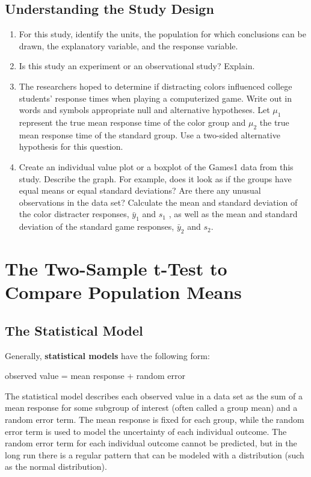 \documentclass[
]{report}
\begin{document}
\subsection{Understanding the Study Design}\label{understanding-the-study-design}

\begin{enumerate}
\def\labelenumi{\arabic{enumi}.}
\item
  For this study, identify the units, the population for which conclusions can be drawn, the explanatory variable, and the response variable.
\item
  Is this study an experiment or an observational study? Explain.
\item
  The researchers hoped to determine if distracting colors influenced college students' response times when playing a computerized game. Write out in words and symbols appropriate null and alternative hypotheses. Let \(\mu_1\) represent the true mean response time of the color group and \(\mu_2\) the true mean response time of the standard group. Use a two-sided alternative hypothesis for this question.
\item
  Create an individual value plot or a boxplot of the Games1 data from this study. Describe the graph. For example, does it look as if the groups have equal means or equal standard deviations? Are there any unusual observations in the data set? Calculate the mean and standard deviation of the color distracter responses, \(\bar{y}_1\) and \(s_1\) , as well as the mean and standard deviation of the standard game responses, \(\bar{y}_2\) and \(s_2\).
\end{enumerate}

\section{The Two-Sample t-Test to Compare Population Means}\label{the-two-sample-t-test-to-compare-population-means}

\subsection{The Statistical Model}\label{the-statistical-model}

Generally, \textbf{statistical models} have the following form:

observed value = mean response + random error

The statistical model describes each observed value in a data set as the sum of a mean response for some subgroup of interest (often called a group mean) and a random error term. The mean response is fixed for each group, while the random error term is used to model the uncertainty of each individual outcome. The random error term for each individual outcome cannot be predicted, but in the long run there is a regular pattern that can be modeled with a distribution (such as the normal distribution).
\end{document}
